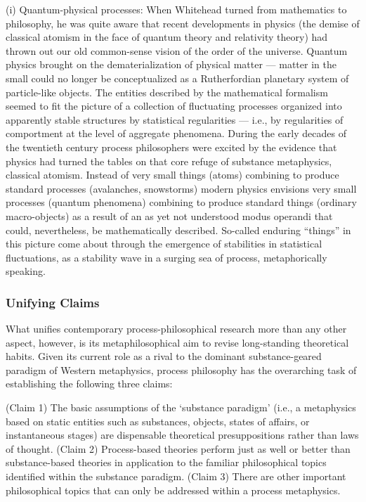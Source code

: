 (i) Quantum-physical processes: When Whitehead turned from mathematics to philosophy, he was quite aware that recent developments in physics (the demise of classical atomism in the face of quantum theory and relativity theory) had thrown out our old common-sense vision of the order of the universe. Quantum physics brought on the dematerialization of physical matter — matter in the small could no longer be conceptualized as a Rutherfordian planetary system of particle-like objects. The entities described by the mathematical formalism seemed to fit the picture of a collection of fluctuating processes organized into apparently stable structures by statistical regularities — i.e., by regularities of comportment at the level of aggregate phenomena. During the early decades of the twentieth century process philosophers were excited by the evidence that physics had turned the tables on that core refuge of substance metaphysics, classical atomism. Instead of very small things (atoms) combining to produce standard processes (avalanches, snowstorms) modern physics envisions very small processes (quantum phenomena) combining to produce standard things (ordinary macro-objects) as a result of an as yet not understood modus operandi that could, nevertheless, be mathematically described. So-called enduring “things” in this picture come about through the emergence of stabilities in statistical fluctuations, as a stability wave in a surging sea of process, metaphorically speaking.
\subsubsection{Unifying Claims}

What unifies contemporary process-philosophical research more than any other aspect, however, is its metaphilosophical aim to revise long-standing theoretical habits. Given its current role as a rival to the dominant substance-geared paradigm of Western metaphysics, process philosophy has the overarching task of establishing the following three claims:

(Claim 1) The basic assumptions of the ‘substance paradigm’ (i.e., a metaphysics based on static entities such as substances, objects, states of affairs, or instantaneous stages) are dispensable theoretical presuppositions rather than laws of thought.
(Claim 2) Process-based theories perform just as well or better than substance-based theories in application to the familiar philosophical topics identified within the substance paradigm.
(Claim 3) There are other important philosophical topics that can only be addressed within a process metaphysics.

